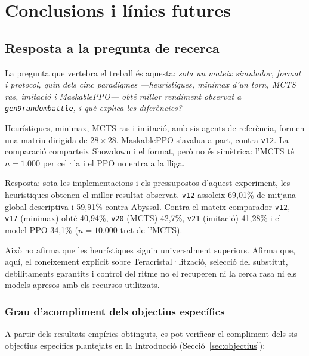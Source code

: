 \chapter{Conclusions i línies futures}
\label{chap:conclusions}

\section{Resposta a la pregunta de recerca}

La pregunta que vertebra el treball és aquesta: \emph{sota un mateix simulador, format i protocol, quin dels cinc paradigmes ---heurístiques, minimax d'un torn, MCTS ras, imitació i MaskablePPO--- obté millor rendiment observat a \texttt{gen9randombattle}, i què explica les diferències?}

Heurístiques, minimax, MCTS ras i imitació, amb sis agents de referència, formen una matriu dirigida de $28\times 28$. MaskablePPO s'avalua a part, contra \texttt{v12}. La comparació comparteix Showdown i el format, però no és simètrica: l'MCTS té $n=1.000$ per cel·la i el PPO no entra a la lliga.

Resposta: sota les implementacions i els pressupostos d'aquest experiment, les heurístiques obtenen el millor resultat observat. \texttt{v12} assoleix 69,01\% de mitjana global descriptiva i 59,91\% contra Abyssal. Contra el mateix comparador \texttt{v12}, \texttt{v17} (minimax) obté 40,94\%, \texttt{v20} (MCTS) 42,7\%, \texttt{v21} (imitació) 41,28\% i el model PPO 34,1\% ($n=10.000$ tret de l'MCTS).

Això no afirma que les heurístiques siguin universalment superiors. Afirma que, aquí, el coneixement explícit sobre Teracristal·lització, selecció del substitut, debilitaments garantits i control del ritme no el recuperen ni la cerca rasa ni els models apresos amb els recursos utilitzats.

\subsection{Grau d'acompliment dels objectius específics}

A partir dels resultats empírics obtinguts, es pot verificar el compliment dels sis objectius específics plantejats en la Introducció (Secció~\ref{sec:objectius}):

